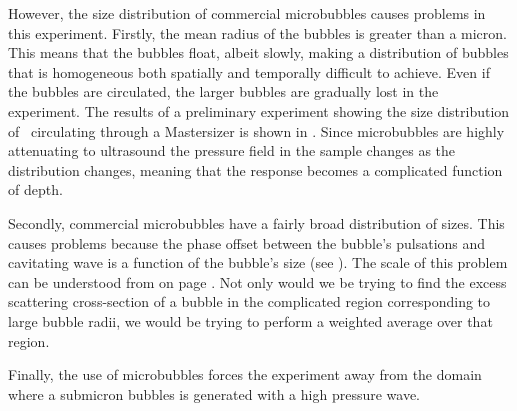 {  However, the size distribution of commercial microbubbles causes problems in this experiment.
  Firstly, the mean radius of the bubbles is greater than a micron.
  This means that the bubbles float, albeit slowly, making a distribution of bubbles
  that is homogeneous both spatially and temporally difficult to achieve.
  Even if the bubbles are circulated, the larger bubbles are gradually lost in the experiment.
  The results of a preliminary experiment showing the size distribution of \Sonovue\ circulating 
   through a Mastersizer is shown in .
  Since microbubbles are highly attenuating to ultrasound 
  the pressure field in the sample changes as the distribution changes,
  meaning that the response becomes a complicated function of depth.


  Secondly, commercial microbubbles have a fairly broad distribution of sizes.
  This causes problems because the phase offset between the bubble's pulsations and  cavitating wave 
  is a function of the bubble's size (see ).
  The scale of this problem can be understood from  on page \pageref{fig:phase_radial}.
  Not only would we be trying to find the excess scattering cross-section of  a bubble in the complicated region
  corresponding to large bubble radii, we would be trying to perform a weighted average over that region.

Finally, the use of microbubbles forces the experiment away from the domain where a submicron bubbles is generated  with a high pressure wave.
  




}
